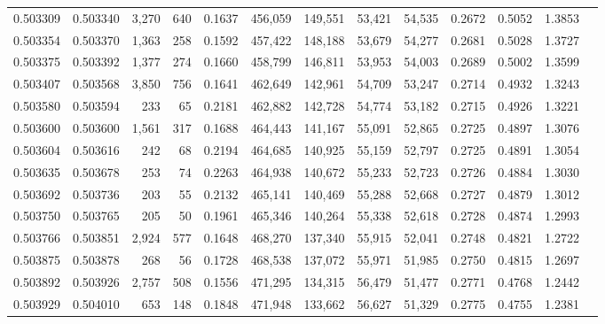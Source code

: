 \begin{tabular}{rrrrrrrrrrrrr}
0.503309 & 0.503340 & 3,270 &   640 &                                     0.1637 & 456,059 & 149,551 &  53,421 &  54,535 & 0.2672 & 0.5052 & 1.3853 \\
0.503354 & 0.503370 & 1,363 &   258 &                                     0.1592 & 457,422 & 148,188 &  53,679 &  54,277 & 0.2681 & 0.5028 & 1.3727 \\
0.503375 & 0.503392 & 1,377 &   274 &                                     0.1660 & 458,799 & 146,811 &  53,953 &  54,003 & 0.2689 & 0.5002 & 1.3599 \\
0.503407 & 0.503568 & 3,850 &   756 &                                     0.1641 & 462,649 & 142,961 &  54,709 &  53,247 & 0.2714 & 0.4932 & 1.3243 \\
0.503580 & 0.503594 &   233 &    65 &                                     0.2181 & 462,882 & 142,728 &  54,774 &  53,182 & 0.2715 & 0.4926 & 1.3221 \\
0.503600 & 0.503600 & 1,561 &   317 &                                     0.1688 & 464,443 & 141,167 &  55,091 &  52,865 & 0.2725 & 0.4897 & 1.3076 \\
0.503604 & 0.503616 &   242 &    68 &                                     0.2194 & 464,685 & 140,925 &  55,159 &  52,797 & 0.2725 & 0.4891 & 1.3054 \\
0.503635 & 0.503678 &   253 &    74 &                                     0.2263 & 464,938 & 140,672 &  55,233 &  52,723 & 0.2726 & 0.4884 & 1.3030 \\
0.503692 & 0.503736 &   203 &    55 &                                     0.2132 & 465,141 & 140,469 &  55,288 &  52,668 & 0.2727 & 0.4879 & 1.3012 \\
0.503750 & 0.503765 &   205 &    50 &                                     0.1961 & 465,346 & 140,264 &  55,338 &  52,618 & 0.2728 & 0.4874 & 1.2993 \\
0.503766 & 0.503851 & 2,924 &   577 &                                     0.1648 & 468,270 & 137,340 &  55,915 &  52,041 & 0.2748 & 0.4821 & 1.2722 \\
0.503875 & 0.503878 &   268 &    56 &                                     0.1728 & 468,538 & 137,072 &  55,971 &  51,985 & 0.2750 & 0.4815 & 1.2697 \\
0.503892 & 0.503926 & 2,757 &   508 &                                     0.1556 & 471,295 & 134,315 &  56,479 &  51,477 & 0.2771 & 0.4768 & 1.2442 \\
0.503929 & 0.504010 &   653 &   148 &                                     0.1848 & 471,948 & 133,662 &  56,627 &  51,329 & 0.2775 & 0.4755 & 1.2381 \\

\end{tabular}
